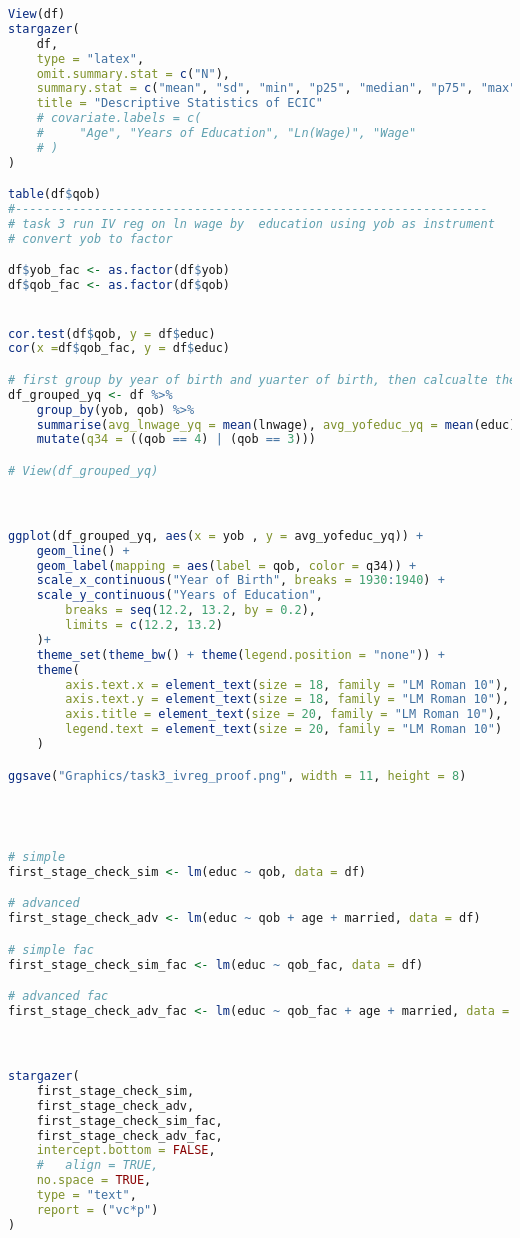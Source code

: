 \documentclass[a4paper]{article}
\begin{document}
\begin{lstlisting}[language=R]
View(df)
stargazer(
    df,
    type = "latex",
    omit.summary.stat = c("N"),
    summary.stat = c("mean", "sd", "min", "p25", "median", "p75", "max"),
    title = "Descriptive Statistics of ECIC"
    # covariate.labels = c(
    #     "Age", "Years of Education", "Ln(Wage)", "Wage"
    # )
)

table(df$qob)
#------------------------------------------------------------------
# task 3 run IV reg on ln wage by  education using yob as instrument
# convert yob to factor

df$yob_fac <- as.factor(df$yob)
df$qob_fac <- as.factor(df$qob)


cor.test(df$qob, y = df$educ)
cor(x =df$qob_fac, y = df$educ)

# first group by year of birth and yuarter of birth, then calcualte the avg lnwage, education for each quarter for each year
df_grouped_yq <- df %>%
    group_by(yob, qob) %>%
    summarise(avg_lnwage_yq = mean(lnwage), avg_yofeduc_yq = mean(educ))%>%
    mutate(q34 = ((qob == 4) | (qob == 3)))

# View(df_grouped_yq)



ggplot(df_grouped_yq, aes(x = yob , y = avg_yofeduc_yq)) +
    geom_line() +
    geom_label(mapping = aes(label = qob, color = q34)) +
    scale_x_continuous("Year of Birth", breaks = 1930:1940) +
    scale_y_continuous("Years of Education",
        breaks = seq(12.2, 13.2, by = 0.2),
        limits = c(12.2, 13.2)
    )+
    theme_set(theme_bw() + theme(legend.position = "none")) +
    theme(
        axis.text.x = element_text(size = 18, family = "LM Roman 10"),
        axis.text.y = element_text(size = 18, family = "LM Roman 10"),
        axis.title = element_text(size = 20, family = "LM Roman 10"),
        legend.text = element_text(size = 20, family = "LM Roman 10")
    )

ggsave("Graphics/task3_ivreg_proof.png", width = 11, height = 8)




# simple
first_stage_check_sim <- lm(educ ~ qob, data = df)

# advanced
first_stage_check_adv <- lm(educ ~ qob + age + married, data = df)

# simple fac
first_stage_check_sim_fac <- lm(educ ~ qob_fac, data = df)

# advanced fac
first_stage_check_adv_fac <- lm(educ ~ qob_fac + age + married, data = df)



stargazer(
    first_stage_check_sim,
    first_stage_check_adv,
    first_stage_check_sim_fac,
    first_stage_check_adv_fac,
    intercept.bottom = FALSE,
    #   align = TRUE,
    no.space = TRUE,
    type = "text",
    report = ("vc*p")
)



\end{lstlisting}
\end{document}
